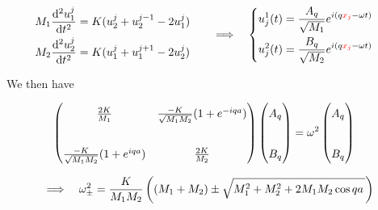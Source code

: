 \begin{frame}
  \begin{equation*}
    \begin{aligned}
      M_1 \frac{\mathrm{d}^2 u^{j}_1}{\mathrm{d}t^2} &= K (u^{j}_2 + u^{j-1}_2 - 2u^{j}_1) \cr
      M_2 \frac{\mathrm{d}^2 u^{j}_2}{\mathrm{d}t^2} &= K (u^{j}_1 + u^{j+1}_1 - 2u^{j}_2)
    \end{aligned}
    \quad \Longrightarrow \quad%
    \left\{
    \begin{aligned}
      u_{j}^1(t) &= \frac{A_q}{\sqrt{M_1}} e^{i(q\mathcolor{red}{x_j} - \omega t)} \cr
      u_{j}^2(t) &= \frac{B_q}{\sqrt{M_2}} e^{i(q\mathcolor{red}{x_j} - \omega t)} \cr
    \end{aligned}
    \right.
  \end{equation*}

  We then have

    \begin{equation*}
      \begin{aligned}
        \begin{pmatrix}
            \renewcommand*{\arraystretch}{1.5}
            \frac{2K}{M_1} & \frac{-K}{\sqrt{M_1M_2}}(1+e^{-iqa}) \\
            \phantom{.} \\
            \frac{-K}{\sqrt{M_1M_2}}(1+e^{iqa}) & \frac{2K}{M_2}
        \end{pmatrix}
        \begin{pmatrix}
        A_q \\
        \phantom{a} \\
        B_q 
        \end{pmatrix}
        &=
        \omega^2
        \begin{pmatrix}
        A_q \\
        \phantom{a} \\
        B_q 
        \end{pmatrix}
      \end{aligned}
    \end{equation*}
    
    \medskip
    \begin{equation*}
      \Longrightarrow \quad \omega_\pm^2 = {K\over M_1M_2} \left((M_1 + M_2) \pm \sqrt{M_1^2 + M_2^2 + 2M_1M_2\cos{qa}\,}\right)
    \end{equation*}
\end{frame}
